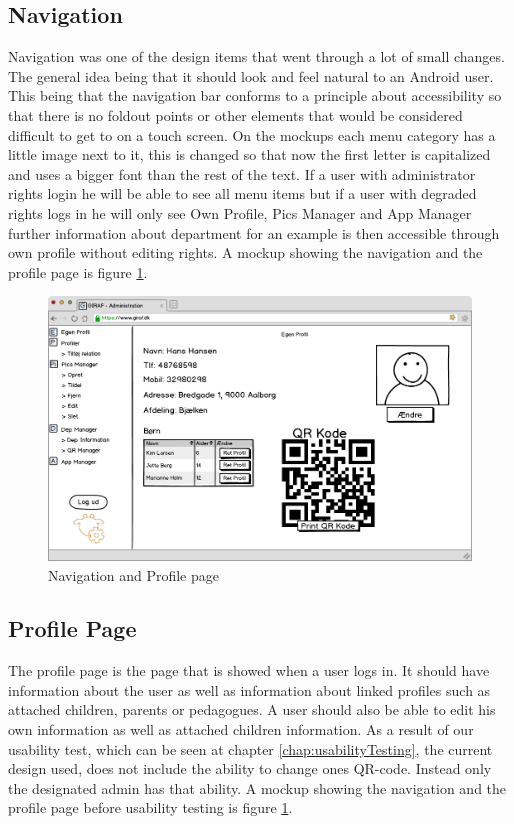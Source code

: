 \subsection{Navigation}
Navigation was one of the design items that went through a lot of small changes. The general idea being that it should look and feel natural to an Android user. This being that the navigation bar conforms to a principle about accessibility so that there is no foldout points or other elements that would be considered difficult to get to on a touch screen. On the mockups each menu category has a little image next to it, this is changed so that now the first letter is capitalized and uses a bigger font than the rest of the text. If a user with administrator rights login he will be able to see all menu items but if a user with degraded rights logs in he will only see Own Profile, Pics Manager and App Manager further information about  department for an example is then accessible through own profile without editing rights.  A mockup showing the navigation and the profile page is figure \ref{fig:own_profileDesign}.
\begin{figure}[p]
\centering
\includegraphics[width=1\textwidth]{images/mockup/egenProfil.png}
\caption{Navigation and Profile page}
\label{fig:own_profileDesign}
\end{figure}

\subsection{Profile Page}
The profile page is the page that is showed when a user logs in. It should have information about the user as well as information about linked profiles such as attached children, parents or pedagogues. A user should also be able to edit his own information as well as attached children information. As a result of our usability test, which can be seen at chapter \ref{chap:usabilityTesting}, the current design used, does not include the ability to change ones QR-code. Instead only the designated admin has that ability. A mockup showing the navigation and the profile page before usability testing is figure \ref{fig:own_profileDesign}.

